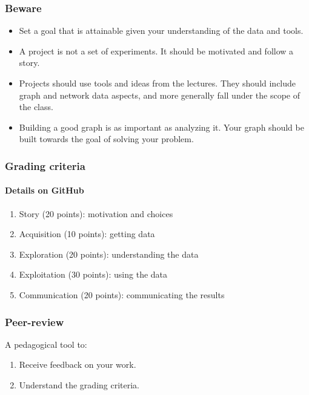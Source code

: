 \documentclass[aspectratio=169]{beamer}
\begin{document}

\begin{frame}
	\frametitle{Beware}
	\begin{itemize}
		\item Set a goal that is attainable given your understanding of the data and tools.
		\vfill
		\item A project is not a set of experiments. It should be motivated and follow a story.
		\vfill
		\item Projects should use tools and ideas from the lectures. They should include graph and network data aspects, and more generally fall under the scope of the class.
		\vfill
		\item Building a good graph is as important as analyzing it. Your graph should be built towards the goal of solving your problem. %
	\end{itemize}
\end{frame}


\begin{frame}
	\frametitle{Grading criteria}
	\framesubtitle{Details on GitHub}
	\begin{enumerate}
		\item Story (20 points): motivation and choices
		\vfill
		\item Acquisition (10 points): getting data
		\vfill
		\item Exploration (20 points): understanding the data
		\vfill
		\item Exploitation (30 points): using the data
		\vfill
		\item Communication (20 points): communicating the results
	\end{enumerate}
\end{frame}


\begin{frame}
	\frametitle{Peer-review}
	A pedagogical tool to:
	\vfill
	\begin{enumerate}
		\item Receive feedback on your work.
		\vfill
		\item Understand the grading criteria. %
	\end{enumerate}
	\vfill
\end{frame}

\end{document}
